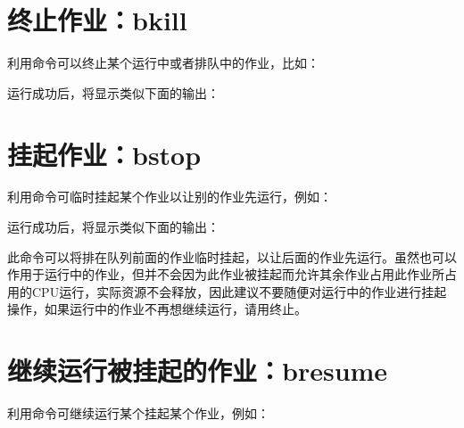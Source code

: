 \documentclass[a4paper,12pt,english]{sphinxmanual}
\begin{document}
\section{终止作业：bkill}
\label{\detokenize{lsf/lsf:bkill}}
\sphinxAtStartPar
利用命令可以终止某个运行中或者排队中的作业，比如：

\sphinxAtStartPar
{}

\sphinxAtStartPar
运行成功后，将显示类似下面的输出：

\begin{sphinxVerbatim}[commandchars=\\\{\}]
    
\end{sphinxVerbatim}


\section{挂起作业：bstop}
\label{\detokenize{lsf/lsf:bstop}}
\sphinxAtStartPar
利用命令可临时挂起某个作业以让别的作业先运行，例如：

\sphinxAtStartPar
{}

\sphinxAtStartPar
运行成功后，将显示类似下面的输出：

\begin{sphinxVerbatim}[commandchars=\\\{\}]
    
\end{sphinxVerbatim}

\sphinxAtStartPar
此命令可以将排在队列前面的作业临时挂起，以让后面的作业先运行。虽然也可以作用于运行中的作业，但并不会因为此作业被挂起而允许其余作业占用此作业所占用的CPU运行，实际资源不会释放，因此建议不要随便对运行中的作业进行挂起操作，如果运行中的作业不再想继续运行，请用终止。


\section{继续运行被挂起的作业：bresume}
\label{\detokenize{lsf/lsf:bresume}}
\sphinxAtStartPar
利用命令可继续运行某个挂起某个作业，例如：

\sphinxAtStartPar
{}
\end{document}
